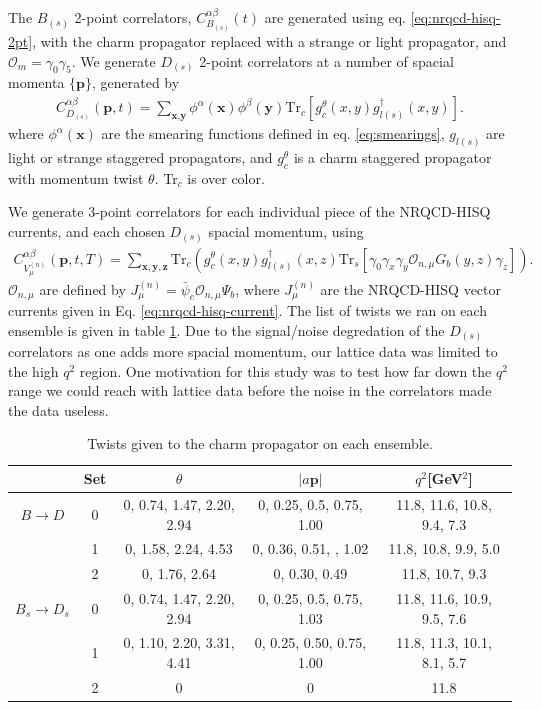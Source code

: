 The $B_{(s)}$ 2-point correlators, $C_{B_{(s)}}^{\alpha\beta}(t)$ are generated using eq. \eqref{eq:nrqcd-hisq-2pt}, with the charm propagator replaced with a strange or light propagator, and $\mathcal{O}_{m} = \gamma_0\gamma_5$. We generate $D_{(s)}$ 2-point correlators at a number of spacial momenta $\{{\textbf{p}}\}$, generated by
\begin{align}
  C_{D_{(s)}}^{\alpha\beta}({\textbf{p}},t) = \sum_{\textbf{x},\textbf{y}} \phi^{\alpha}({\textbf{x}})\phi^{\beta}({\textbf{y}}) \text{Tr}_c[g_c^{\theta}(x,y) g^{\dagger}_{l(s)}(x,y) ].
\end{align}
where $\phi^{\alpha}({\textbf{x}})$ are the smearing functions defined in eq. \eqref{eq:smearings}, $g_{l(s)}$ are light or strange staggered propagators, and $g_c^{\theta}$ is a charm staggered propagator with momentum twist $\theta$. Tr$_c$ is over color.

We generate 3-point correlators for each individual piece of the NRQCD-HISQ currents, and each chosen $D_{(s)}$ spacial momentum, using
\begin{align}
  C_{V_{\mu}^{(n)}}^{\alpha\beta} ({\textbf{p}},t,T) = \sum_{\textbf{x},\textbf{y},\textbf{z}} \text{Tr}_c\left( g_c^{\theta}(x,y) g_{l(s)}^{\dagger}(x,z) \text{Tr}_s\left[ \gamma_0 \gamma_x\gamma_y \mathcal{O}_{n,\mu}G_b(y,z) \gamma_z \right] \right).
\end{align}
$\mathcal{O}_{n,\mu}$ are defined by $J_{\mu}^{(n)} = \bar{\psi}_c \mathcal{O}_{n,\mu} \Psi_b$, where $J_{\mu}^{(n)}$ are the NRQCD-HISQ vector currents given in Eq. \eqref{eq:nrqcd-hisq-current}. The list of twists we ran on each ensemble is given in table \ref{tab:nrqcd_twists}. Due to the signal/noise degredation of the $D_{(s)}$ correlators as one adds more spacial momentum, our lattice data was limited to the high $q^2$ region. One motivation for this study was to test how far down the $q^2$ range we could reach with lattice data before the noise in the correlators made the data useless.

\begin{table}[htb!]
  \hspace{-15pt}
 \begin{tabular}{c c c c c}
 \hline
 & Set & $\theta$ & $|a{\textbf{p}}|$ & $q^2$[GeV$^2$] \\ [0.5ex] 
 \hline
 $B\to D$ & 0 & 0, 0.74, 1.47, 2.20, 2.94 & 0, 0.25, 0.5, 0.75, 1.00 & 11.8, 11.6, 10.8, 9.4, 7.3 \\ [1ex]
 & 1 & 0, 1.58, 2.24, 4.53 & 0, 0.36, 0.51, , 1.02 & 11.8, 10.8, 9.9, 5.0  \\ [1ex]
 & 2 & 0, 1.76, 2.64 & 0, 0.30, 0.49 & 11.8, 10.7, 9.3 \\ [1ex]
 \hline
 $B_s\to D_s$ & 0 & 0, 0.74, 1.47, 2.20, 2.94 & 0, 0.25, 0.5, 0.75, 1.03 & 11.8, 11.6, 10.9, 9.5, 7.6 \\ [1ex]
 & 1 & 0, 1.10, 2.20, 3.31, 4.41 & 0, 0.25, 0.50, 0.75, 1.00 & 11.8, 11.3, 10.1, 8.1, 5.7 \\ [1ex]
 & 2 & 0 & 0 & 11.8\\  [1ex]
 \hline
\end{tabular}
 \caption{Twists given to the charm propagator on each ensemble. \label{tab:nrqcd_twists} }
\end{table}

